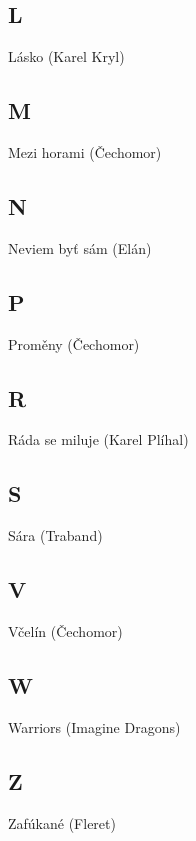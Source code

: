 \subsection*{L}
Lásko (Karel Kryl)

\subsection*{M}
Mezi horami (Čechomor)

\subsection*{N}
Neviem byť sám (Elán)


\subsection*{P}
Proměny (Čechomor)

\subsection*{R}
Ráda se miluje (Karel Plíhal)

\subsection*{S}
Sára (Traband)


\subsection*{V}
Včelín (Čechomor)

\subsection*{W}
Warriors (Imagine Dragons)


\subsection*{Z}
Zafúkané (Fleret)

\newpage